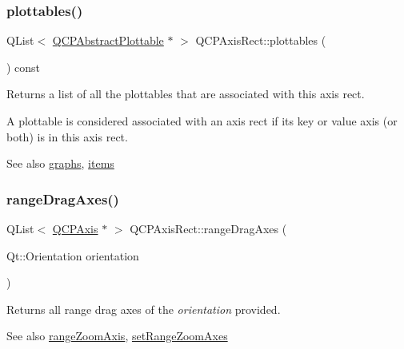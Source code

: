 \mbox{\label{class_q_c_p_axis_rect_a587d073a97b27bc7293fab4b2774ad59}} 
\subsubsection{\texorpdfstring{plottables()}{plottables()}}
{\footnotesize\ttfamily Q\+List$<$ \mbox{\hyperlink{class_q_c_p_abstract_plottable}{Q\+C\+P\+Abstract\+Plottable}} $\ast$ $>$ Q\+C\+P\+Axis\+Rect\+::plottables (\begin{DoxyParamCaption}{ }\end{DoxyParamCaption}) const}

Returns a list of all the plottables that are associated with this axis rect.

A plottable is considered associated with an axis rect if its key or value axis (or both) is in this axis rect.

\begin{DoxySeeAlso}{See also}
\mbox{\hyperlink{class_q_c_p_axis_rect_a2d9ded3eca97be1fcb5867949391bb88}{graphs}}, \mbox{\hyperlink{class_q_c_p_axis_rect_a03c113a2175448300ee8f944e24776ba}{items}} 
\end{DoxySeeAlso}
\mbox{\label{class_q_c_p_axis_rect_aae5f99a044ca911685a306f01b7ff941}} 
\subsubsection{\texorpdfstring{range\+Drag\+Axes()}{rangeDragAxes()}}
{\footnotesize\ttfamily Q\+List$<$ \mbox{\hyperlink{class_q_c_p_axis}{Q\+C\+P\+Axis}} $\ast$ $>$ Q\+C\+P\+Axis\+Rect\+::range\+Drag\+Axes (\begin{DoxyParamCaption}\item[{Qt\+::\+Orientation}]{orientation }\end{DoxyParamCaption})}

Returns all range drag axes of the {\itshape orientation} provided.

\begin{DoxySeeAlso}{See also}
\mbox{\hyperlink{class_q_c_p_axis_rect_a679c63f2b8daccfe6ec5110dce3dd3b6}{range\+Zoom\+Axis}}, \mbox{\hyperlink{class_q_c_p_axis_rect_a9442cca2aa358405f39a64d51eca13d2}{set\+Range\+Zoom\+Axes}} 
\end{DoxySeeAlso}
\mbox{\label{class_q_c_p_axis_rect_a6d7c22cfc54fac7a3d6ef80b133a8574}} 
